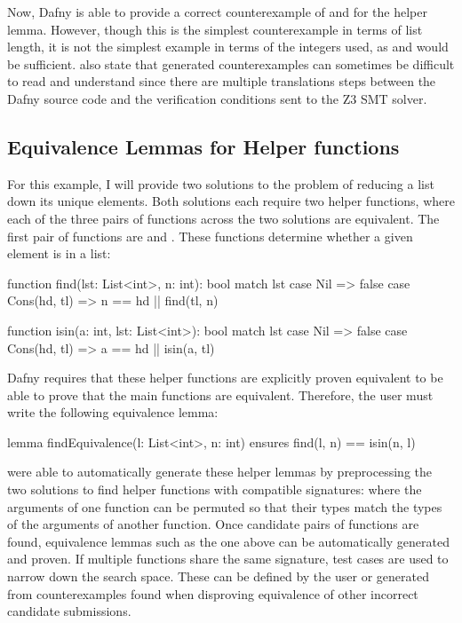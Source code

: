 Now, Dafny is able to provide a correct counterexample of  and  for the helper lemma. However, though this is the simplest counterexample in terms of list length, it is not the simplest example in terms of the integers used, as  and  would be sufficient. \textcite{putrueleMaskDToolMeasuring2022} also state that generated counterexamples can sometimes be difficult to read and understand since there are multiple translations steps between the Dafny source code and the verification conditions sent to the Z3 SMT solver.

\subsection{Equivalence Lemmas for Helper functions}\label{sec:equivalence-lemmas}

For this example, I will provide two solutions to the problem of reducing a list down its unique elements. Both solutions each require two helper functions, where each of the three pairs of functions across the two solutions are equivalent. The first pair of functions are  and . These functions determine whether a given element is in a list:
\begin{dafny}
function find(lst: List<int>, n: int): bool
{
  match lst
  case Nil => false
  case Cons(hd, tl) => n == hd || find(tl, n)
}

function isin(a: int, lst: List<int>): bool
{
  match lst
  case Nil => false
  case Cons(hd, tl) => a == hd || isin(a, tl)
}
\end{dafny}
%
Dafny requires that these helper functions are explicitly proven equivalent to be able to prove that the main functions are equivalent. Therefore, the user must write the following equivalence lemma:
\begin{dafny}
lemma findEquivalence(l: List<int>, n: int)
  ensures find(l, n) == isin(n, l)
{}
\end{dafny}
%
\textcite{milovancevicProvingDisprovingEquivalence2023} were able to automatically generate these helper lemmas by preprocessing the two solutions to find helper functions with compatible signatures: where the arguments of one function can be permuted so that their types match the types of the arguments of another function. Once candidate pairs of functions are found, equivalence lemmas such as the one above can be automatically generated and proven. If multiple functions share the same signature, test cases are used to narrow down the search space. These can be defined by the user or generated from counterexamples found when disproving equivalence of other incorrect candidate submissions.


